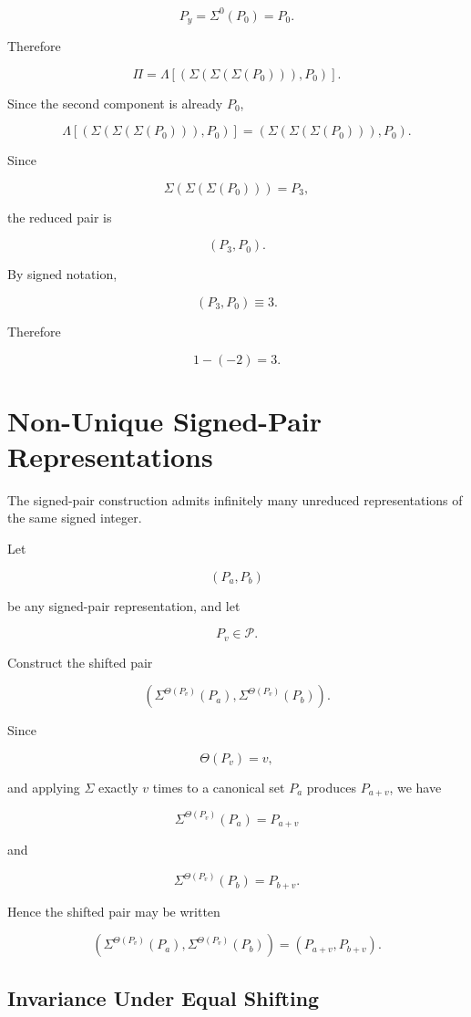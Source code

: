 \documentclass[12pt]{article}
\begin{document}
\[
P_y
=
\Sigma^0(P_0)
=
P_0.
\]

Therefore

\[
\Pi
=
\Lambda[(\Sigma(\Sigma(\Sigma(P_0))),P_0)].
\]

Since the second component is already \(P_0\),

\[
\Lambda[(\Sigma(\Sigma(\Sigma(P_0))),P_0)]
=
(\Sigma(\Sigma(\Sigma(P_0))),P_0).
\]

Since

\[
\Sigma(\Sigma(\Sigma(P_0)))=P_3,
\]

the reduced pair is

\[
(P_3,P_0).
\]

By signed notation,

\[
(P_3,P_0)\equiv3.
\]

Therefore

\[
\boxed{
1-(-2)=3.
}
\]

\section*{Non-Unique Signed-Pair Representations}

The signed-pair construction admits infinitely many unreduced representations of the same signed integer.

Let

\[
(P_a,P_b)
\]

be any signed-pair representation, and let

\[
P_v\in\mathcal P.
\]

Construct the shifted pair

\[
\left(
\Sigma^{\Theta(P_v)}(P_a),
\Sigma^{\Theta(P_v)}(P_b)
\right).
\]

Since

\[
\Theta(P_v)=v,
\]

and applying \(\Sigma\) exactly \(v\) times to a canonical set \(P_a\) produces \(P_{a+v}\), we have

\[
\Sigma^{\Theta(P_v)}(P_a)=P_{a+v}
\]

and

\[
\Sigma^{\Theta(P_v)}(P_b)=P_{b+v}.
\]

Hence the shifted pair may be written

\[
\boxed{
\left(
\Sigma^{\Theta(P_v)}(P_a),
\Sigma^{\Theta(P_v)}(P_b)
\right)
=
(P_{a+v},P_{b+v}).
}
\]

\subsection*{Invariance Under Equal Shifting}
\end{document}
